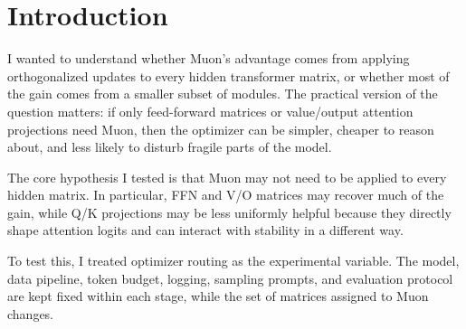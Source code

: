 \section{Introduction}

I wanted to understand whether Muon's advantage comes from applying orthogonalized updates to every hidden transformer matrix, or whether most of the gain comes from a smaller subset of modules. The practical version of the question matters: if only feed-forward matrices or value/output attention projections need Muon, then the optimizer can be simpler, cheaper to reason about, and less likely to disturb fragile parts of the model.

The core hypothesis I tested is that Muon may not need to be applied to every hidden matrix. In particular, FFN and V/O matrices may recover much of the gain, while Q/K projections may be less uniformly helpful because they directly shape attention logits and can interact with stability in a different way.

To test this, I treated optimizer routing as the experimental variable. The model, data pipeline, token budget, logging, sampling prompts, and evaluation protocol are kept fixed within each stage, while the set of matrices assigned to Muon changes.
